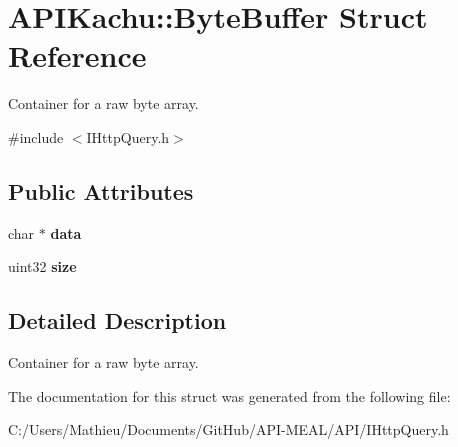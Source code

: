 \hypertarget{struct_a_p_i_kachu_1_1_byte_buffer}{}\section{A\+P\+I\+Kachu\+:\+:Byte\+Buffer Struct Reference}
\label{struct_a_p_i_kachu_1_1_byte_buffer}


Container for a raw byte array.  




{\ttfamily \#include $<$I\+Http\+Query.\+h$>$}

\subsection*{Public Attributes}
\begin{DoxyCompactItemize}
\item 
char $\ast$ {\bfseries data}\hypertarget{struct_a_p_i_kachu_1_1_byte_buffer_ac67760fc8b78b00801de4fb81e4d0899}{}\label{struct_a_p_i_kachu_1_1_byte_buffer_ac67760fc8b78b00801de4fb81e4d0899}

\item 
uint32 {\bfseries size}\hypertarget{struct_a_p_i_kachu_1_1_byte_buffer_ad401631eecddebd840bbfb01e9b08fa0}{}\label{struct_a_p_i_kachu_1_1_byte_buffer_ad401631eecddebd840bbfb01e9b08fa0}

\end{DoxyCompactItemize}


\subsection{Detailed Description}
Container for a raw byte array. 

The documentation for this struct was generated from the following file\+:\begin{DoxyCompactItemize}
\item 
C\+:/\+Users/\+Mathieu/\+Documents/\+Git\+Hub/\+A\+P\+I-\/\+M\+E\+A\+L/\+A\+P\+I/I\+Http\+Query.\+h\end{DoxyCompactItemize}
